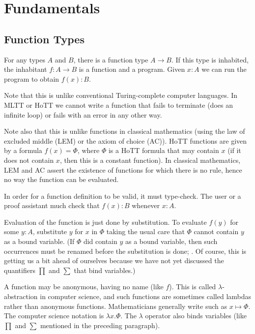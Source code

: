 \documentclass[11pt]{article}
\begin{document}
\section{Fundamentals}

\subsection{Function Types}

For any types $A$ and $B$, there is a function type $A \to B$.
If this type is inhabited, the inhabitant $f : A \to B$ is a function
and a program.  Given $x : A$ we can run the program to obtain $f(x) : B$.

Note that this is unlike conventional Turing-complete computer languages.
In MLTT or HoTT we cannot write a function that fails to terminate (does
an infinite loop) or fails with an error in any other way.

Note also that this is unlike functions in classical mathematics (using the
law of excluded middle (LEM) or the axiom of choice (AC)).
HoTT functions are given
by a formula $f(x) = \Phi$, where $\Phi$ is a HoTT formula that may contain
$x$ (if it does not contain $x$, then this is a constant function).
In classical mathematics, LEM and AC assert the existence
of functions for which there is no rule, hence no way the function can
be evaluated.

In order for a function definition to be valid, it must type-check.
The user or a proof assistant much check that $f(x) : B$ whenever $x : A$.

Evaluation of the function is just done by substitution.  To evaluate $f(y)$
for some $y : A$, substitute $y$ for $x$ in $\Phi$ taking the usual care that
$\Phi$ cannot contain $y$ as a bound variable.  (If $\Phi$ did contain $y$ as
a bound variable, then such occurrences must be renamed before the
substitution is done; .  Of course,
this is getting us a bit ahead of ourselves because we have not yet discussed
the quantifiers $\prod$ and $\sum$ that bind variables.)

A function may be anonymous, having no name (like $f$).  This is called
$\lambda$-abstraction in computer science, and such functions are sometimes
called lambdas rather than anonymous functions.  Mathematicians generally
write such as $x \mapsto \Phi$.
The computer science notation is $\lambda x. \Phi$.
The $\lambda$ operator also binds variables (like $\prod$ and $\sum$ mentioned
in the preceding paragraph).
\end{document}
